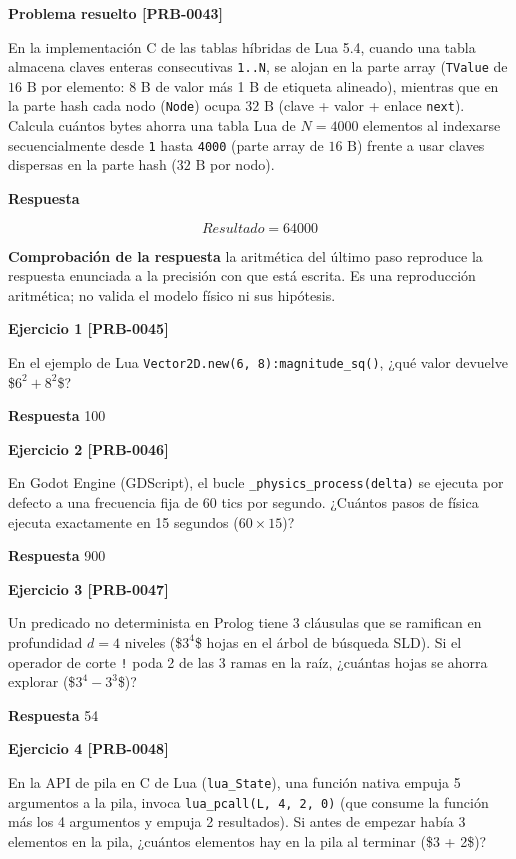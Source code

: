 \documentclass{book}
\begin{document}
\noindent\textbf{Problema resuelto [PRB-0043]}

En la implementación C de las tablas híbridas de Lua 5.4, cuando una tabla almacena claves enteras consecutivas \texttt{1..N}, se alojan en la parte array (\texttt{TValue} de \(16\text{ B}\) por elemento: 8 B de valor más 1 B de etiqueta alineado), mientras que en la parte hash cada nodo (\texttt{Node}) ocupa \(32\text{ B}\) (clave + valor + enlace \texttt{next}). Calcula cuántos bytes ahorra una tabla Lua de \(N = 4000\) elementos al indexarse secuencialmente desde \texttt{1} hasta \texttt{4000} (parte array de \(16\text{ B}\)) frente a usar claves dispersas en la parte hash (\(32\text{ B}\) por nodo).

\noindent\textbf{Respuesta}

\[
Resultado = 64000
\]

\noindent\textbf{Comprobación de la respuesta} la aritmética del último paso reproduce la respuesta enunciada a la precisión con que está escrita. Es una reproducción aritmética; no valida el modelo físico ni sus hipótesis.

\noindent\textbf{Ejercicio 1 [PRB-0045]}

En el ejemplo de Lua \texttt{Vector2D.new(6, 8):magnitude\_sq()}, ¿qué valor devuelve \$\(6^2 + 8^2\)\$?

\noindent\textbf{Respuesta} 100

\noindent\textbf{Ejercicio 2 [PRB-0046]}

En Godot Engine (GDScript), el bucle \texttt{\_physics\_process(delta)} se ejecuta por defecto a una frecuencia fija de 60 tics por segundo. ¿Cuántos pasos de física ejecuta exactamente en 15 segundos (\(60 \times 15\))?

\noindent\textbf{Respuesta} 900

\noindent\textbf{Ejercicio 3 [PRB-0047]}

Un predicado no determinista en Prolog tiene 3 cláusulas que se ramifican en profundidad \(d = 4\) niveles (\$\(3^4\)\$ hojas en el árbol de búsqueda SLD). Si el operador de corte \texttt{!} poda 2 de las 3 ramas en la raíz, ¿cuántas hojas se ahorra explorar (\$\(3^4 - 3^3\)\$)?

\noindent\textbf{Respuesta} 54

\noindent\textbf{Ejercicio 4 [PRB-0048]}

En la API de pila en C de Lua (\texttt{lua\_State}), una función nativa empuja 5 argumentos a la pila, invoca \texttt{lua\_pcall(L, 4, 2, 0)} (que consume la función más los 4 argumentos y empuja 2 resultados). Si antes de empezar había 3 elementos en la pila, ¿cuántos elementos hay en la pila al terminar (\$3 + 2\$)?
\end{document}
